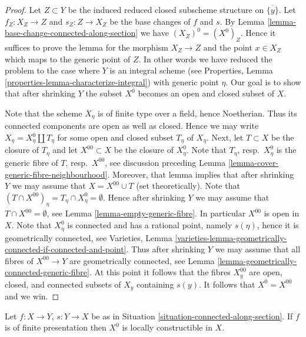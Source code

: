 \begin{proof}
Let $Z \subset Y$ be the induced reduced closed subscheme
structure on $\overline{\{y\}}$. Let $f_Z : X_Z \to Z$ and $s_Z : Z \to X_Z$
be the base changes of $f$ and $s$. By
Lemma \ref{lemma-base-change-connected-along-section}
we have $(X_Z)^0 = (X^0)_Z$. Hence it suffices to prove the lemma for
the morphism $X_Z \to Z$ and the point $x \in X_Z$ which maps to the generic
point of $Z$. In other words we have reduced the problem to the case
where $Y$ is an integral scheme (see
Properties, Lemma \ref{properties-lemma-characterize-integral})
with generic point $\eta$. Our goal is to show that after shrinking
$Y$ the subset $X^0$ becomes an open and closed subset of $X$.

\medskip\noindent
Note that the scheme $X_\eta$ is of finite type over a field, hence Noetherian.
Thus its connected components are open as well as closed. Hence we may write
$X_\eta = X_\eta^0 \amalg T_\eta$ for some open and closed subset
$T_\eta$ of $X_\eta$. Next, let $T \subset X$ be the closure of $T_\eta$
and let $X^{00} \subset X$ be the closure of $X_\eta^0$. Note that
$T_\eta$, resp.\ $X^0_\eta$ is the generic fibre of $T$, resp.\ $X^{00}$,
see discussion preceding
Lemma \ref{lemma-cover-generic-fibre-neighbourhood}.
Moreover, that lemma implies that after shrinking $Y$ we may assume that
$X = X^{00} \cup T$ (set theoretically).
Note that $(T \cap X^{00})_\eta = T_\eta \cap X^0_\eta = \emptyset$.
Hence after shrinking $Y$ we may assume that $T \cap X^{00} = \emptyset$, see
Lemma \ref{lemma-empty-generic-fibre}.
In particular $X^{00}$ is open in $X$. Note that $X^0_\eta$ is connected
and has a rational point, namely $s(\eta)$, hence it is geometrically
connected, see
Varieties,
Lemma \ref{varieties-lemma-geometrically-connected-if-connected-and-point}.
Thus after shrinking $Y$ we may assume that all fibres of $X^{00} \to Y$
are geometrically connected, see
Lemma \ref{lemma-geometrically-connected-generic-fibre}.
At this point it follows that the fibres $X^{00}_y$ are
open, closed, and connected subsets of $X_y$ containing $s(y)$.
It follows that $X^0 = X^{00}$ and we win.
\end{proof}

\begin{lemma}
\label{lemma-connected-along-section-locally-constructible}
Let $f : X \to Y$, $s : Y \to X$ be as in
Situation \ref{situation-connected-along-section}.
If $f$ is of finite presentation then $X^0$ is locally constructible
in $X$.
\end{lemma}

